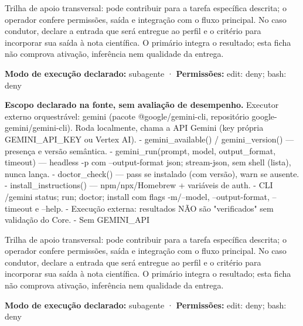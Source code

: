 \begin{funcao}
Trilha de apoio transversal: pode contribuir para a tarefa específica descrita; o operador confere permissões, saída e integração com o fluxo principal. No caso condutor, declare a entrada que será entregue ao perfil e o critério para incorporar sua saída à nota científica. O primário integra o resultado; esta ficha não comprova ativação, inferência nem qualidade da entrega.
\end{funcao}

\begin{arquitetura}
\textbf{Modo de execução declarado:} subagente · \textbf{Permissões:} edit: deny; bash: deny
\end{arquitetura}


\begin{descricao}
\textbf{Escopo declarado na fonte, sem avaliação de desempenho.}
Executor externo orquestrável: gemini (pacote @google/gemini-cli, repositório google-gemini/gemini-cli). Roda localmente, chama a API Gemini (key própria GEMINI\_API\_KEY ou Vertex AI). - gemini\_available() / gemini\_version() — presença e versão semântica. - gemini\_run(prompt, model, output\_format, timeout) — headless -p com --output-format json; stream-json, sem shell (lista), nunca lança. - doctor\_check() — pass se instalado (com versão), warn se ausente. - install\_instructions() — npm/npx/Homebrew + variáveis de auth. - CLI /gemini status; run; doctor; install com flags -m/--model, --output-format, --timeout e --help. - Execução externa: resultados NÃO são "verificados" sem validação do Core. - Sem GEMINI\_API
\end{descricao}

\begin{funcao}
Trilha de apoio transversal: pode contribuir para a tarefa específica descrita; o operador confere permissões, saída e integração com o fluxo principal. No caso condutor, declare a entrada que será entregue ao perfil e o critério para incorporar sua saída à nota científica. O primário integra o resultado; esta ficha não comprova ativação, inferência nem qualidade da entrega.
\end{funcao}

\begin{arquitetura}
\textbf{Modo de execução declarado:} subagente · \textbf{Permissões:} edit: deny; bash: deny
\end{arquitetura}


